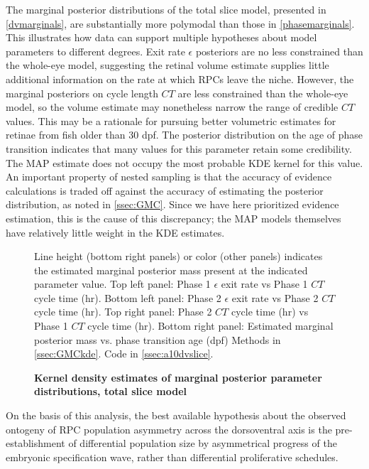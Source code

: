 The marginal posterior distributions of the total slice model, presented in \autoref{dvmarginals}, are substantially more polymodal than those in \autoref{phasemarginals}. This illustrates how data can support multiple hypotheses about model parameters to different degrees. Exit rate $\epsilon$ posteriors are no less constrained than the whole-eye model, suggesting the retinal volume estimate supplies little additional information on the rate at which RPCs leave the niche. However, the marginal posteriors on cycle length $CT$ are less constrained than the whole-eye model, so the volume estimate may nonetheless narrow the range of credible $CT$ values. This may be a rationale for pursuing better volumetric estimates for retinae from fish older than 30 dpf. The posterior distribution on the age of phase transition indicates that many values for this parameter retain some credibility. The MAP estimate does not occupy the most probable KDE kernel for this value. An important property of nested sampling is that the accuracy of evidence calculations is traded off against the accuracy of estimating the posterior distribution, as noted in \autoref{ssec:GMC}. Since we have here prioritized evidence estimation, this is the cause of this discrepancy; the MAP models themselves have relatively little weight in the KDE estimates.

\begin{figure}[!h]
    \caption{{\bf Kernel density estimates of marginal posterior parameter distributions, total slice model}}
    Line height (bottom right panels) or color (other panels) indicates the estimated marginal posterior mass present at the indicated parameter value.
    Top left panel: Phase 1 $\epsilon$ exit rate vs Phase 1 $CT$ cycle time (hr).
    Bottom left panel: Phase 2 $\epsilon$ exit rate vs Phase 2 $CT$ cycle time (hr).
    Top right panel: Phase 2 $CT$ cycle time (hr) vs Phase 1 $CT$ cycle time (hr).
    Bottom right panel: Estimated marginal posterior mass vs. phase transition age (dpf)
    \label{dvmarginals}
    Methods in \autoref{ssec:GMCkde}.
    Code in \autoref{ssec:a10dvslice}.    
\end{figure}

On the basis of this analysis, the best available hypothesis about the observed ontogeny of RPC population asymmetry across the dorsoventral axis is the pre-establishment of differential population size by asymmetrical progress of the embryonic specification wave, rather than differential proliferative schedules.

